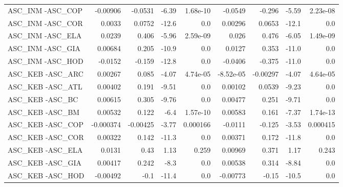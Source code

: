 \begin{tabular}{lrrrrrrrr}
ASC\_INM -ASC\_COP                        &    -0.00906 &      -0.0531 &   -6.39 & 1.68e-10 &    -0.0549 &      -0.296 &        -5.59 &      2.23e-08 \\
ASC\_INM -ASC\_COR                        &      0.0033 &       0.0752 &   -12.6 &      0.0 &    0.00296 &      0.0653 &        -12.1 &           0.0 \\
ASC\_INM -ASC\_ELA                        &      0.0239 &        0.406 &   -5.96 & 2.59e-09 &      0.026 &       0.476 &        -6.05 &      1.49e-09 \\
ASC\_INM -ASC\_GIA                        &     0.00684 &        0.205 &   -10.9 &      0.0 &     0.0127 &       0.353 &        -11.0 &           0.0 \\
ASC\_INM -ASC\_HOD                        &     -0.0152 &       -0.159 &   -12.8 &      0.0 &    -0.0406 &      -0.375 &        -11.0 &           0.0 \\
ASC\_KEB -ASC\_ARC                        &     0.00267 &        0.085 &   -4.07 & 4.74e-05 &  -8.52e-05 &    -0.00297 &        -4.07 &      4.64e-05 \\
ASC\_KEB -ASC\_ATL                        &     0.00402 &        0.191 &   -9.51 &      0.0 &    0.00102 &      0.0539 &        -9.23 &           0.0 \\
ASC\_KEB -ASC\_BC                         &     0.00615 &        0.305 &   -9.76 &      0.0 &    0.00477 &       0.251 &        -9.71 &           0.0 \\
ASC\_KEB -ASC\_BM                         &     0.00532 &        0.122 &    -6.4 & 1.57e-10 &    0.00583 &       0.161 &        -7.37 &      1.74e-13 \\
ASC\_KEB -ASC\_COP                        &   -0.000374 &     -0.00425 &   -3.77 & 0.000166 &    -0.0111 &      -0.125 &        -3.53 &      0.000415 \\
ASC\_KEB -ASC\_COR                        &     0.00322 &        0.142 &   -11.3 &      0.0 &    0.00371 &       0.172 &        -11.8 &           0.0 \\
ASC\_KEB -ASC\_ELA                        &      0.0131 &         0.43 &    1.13 &    0.259 &    0.00969 &       0.371 &         1.17 &         0.243 \\
ASC\_KEB -ASC\_GIA                        &     0.00417 &        0.242 &    -8.3 &      0.0 &    0.00538 &       0.314 &        -8.84 &           0.0 \\
ASC\_KEB -ASC\_HOD                        &    -0.00492 &         -0.1 &   -11.4 &      0.0 &   -0.00773 &       -0.15 &        -10.5 &           0.0 \\

\end{tabular}
